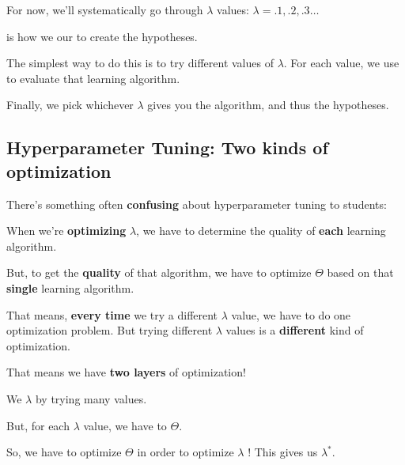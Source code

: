        For now, we'll systematically go through $\lambda$ values: $\lambda=.1, .2, .3 \dots$\\
        
        \begin{concept}
             is how we  our  to create the  hypotheses.
            
            The simplest way to do this is to try  different values of $\lambda$. For each value, we use  to evaluate that learning algorithm.
            
            Finally, we pick whichever $\lambda$ gives you the  algorithm, and thus the  hypotheses.
        \end{concept}
        
    \subsection{Hyperparameter Tuning: Two kinds of optimization}
    
        There's something often \textbf{confusing} about hyperparameter tuning to students:
        
        When we're \textbf{optimizing} $\lambda$, we have to determine the quality of \textbf{each} learning algorithm.
        
        But, to get the \textbf{quality} of that algorithm, we have to optimize $\Theta$ based on that \textbf{single} learning algorithm.
        
        That means, \textbf{every time} we try a different $\lambda$ value, we have to do one optimization problem. But trying different $\lambda$ values is a \textbf{different} kind of optimization.
        
        That means we have \textbf{two layers} of optimization!\\
        
        \begin{clarification}
            We  $\lambda$ by trying many values.
            
            But, for each $\lambda$ value, we have to  $\Theta$.
            
            So, we have to optimize $\Theta$  in order to optimize $\lambda$ ! This gives us $\lambda^*.$
        \end{clarification}
        
